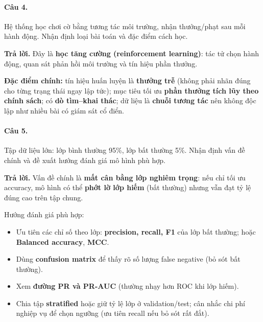 \paragraph{Câu 4.} Hệ thống học chơi cờ bằng tương tác môi trường, nhận thưởng/phạt sau mỗi hành động. Nhận định loại bài toán và đặc điểm cách học.

\medskip\noindent\textbf{Trả lời.} Đây là \textbf{học tăng cường (reinforcement learning)}: tác tử chọn hành động, quan sát phản hồi môi trường và tín hiệu phần thưởng.

\textbf{Đặc điểm chính:} tín hiệu huấn luyện là \textbf{thưởng trễ} (không phải nhãn đúng cho từng trạng thái ngay lập tức); mục tiêu tối ưu \textbf{phần thưởng tích lũy theo chính sách}; có \textbf{dò tìm--khai thác}; dữ liệu là \textbf{chuỗi tương tác} nên không độc lập như nhiều bài có giám sát cổ điển.

\paragraph{Câu 5.} Tập dữ liệu lớn: lớp bình thường 95\%, lớp bất thường 5\%. Nhận định vấn đề chính và đề xuất hướng đánh giá mô hình phù hợp.

\medskip\noindent\textbf{Trả lời.} Vấn đề chính là \textbf{mất cân bằng lớp nghiêm trọng}: nếu chỉ tối ưu accuracy, mô hình có thể \textbf{phớt lờ lớp hiếm} (bất thường) nhưng vẫn đạt tỷ lệ đúng cao trên tập chung.

Hướng đánh giá phù hợp:
\begin{itemize}[nosep]
\item Ưu tiên các chỉ số theo lớp: \textbf{precision, recall, F1} của lớp bất thường; hoặc \textbf{Balanced accuracy}, \textbf{MCC}.
\item Dùng \textbf{confusion matrix} để thấy rõ số lượng false negative (bỏ sót bất thường).
\item Xem \textbf{đường PR và PR-AUC} (thường nhạy hơn ROC khi lớp hiếm).
\item Chia tập \textbf{stratified} hoặc giữ tỷ lệ lớp ở validation/test; cân nhắc chi phí nghiệp vụ để chọn ngưỡng (ưu tiên recall nếu bỏ sót rất đắt).
\end{itemize}
